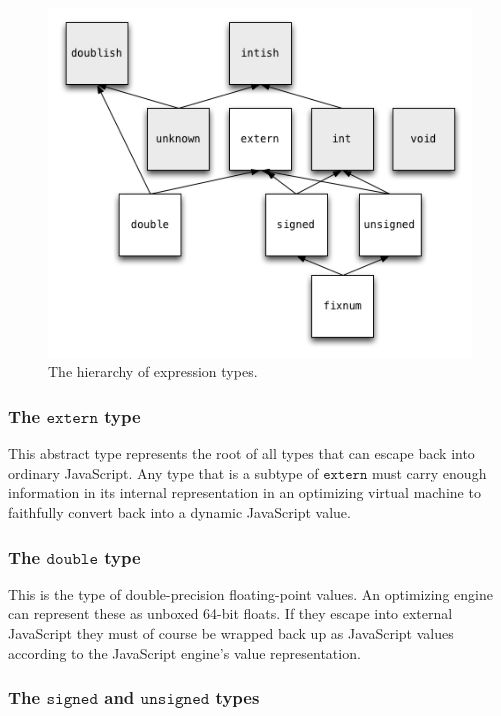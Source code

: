 \documentclass{article}
\newcommand{\unsigned}{\mathtt{unsigned}}
\newcommand{\signed}{\mathtt{signed}}
\newcommand{\double}{\mathtt{double}}
\newcommand{\extern}{\mathtt{extern}}
\begin{document}
\begin{figure}[tb]
\centering
\includegraphics[scale=0.5]{subtypes}
\caption{The hierarchy of expression types.}
\label{fig:subtypes}
\end{figure}

\subsubsection*{The $\extern$ type}

This abstract type represents the root of all types that can escape
back into ordinary JavaScript. Any type that is a subtype of $\extern$
must carry enough information in its internal representation in an
optimizing virtual machine to faithfully convert back into a dynamic
JavaScript value.

\subsubsection*{The $\double$ type}

This is the type of double-precision floating-point values. An
optimizing engine can represent these as unboxed 64-bit floats. If
they escape into external JavaScript they must of course be wrapped
back up as JavaScript values according to the JavaScript engine's
value representation.

\subsubsection*{The $\signed$ and $\unsigned$ types}
\end{document}
